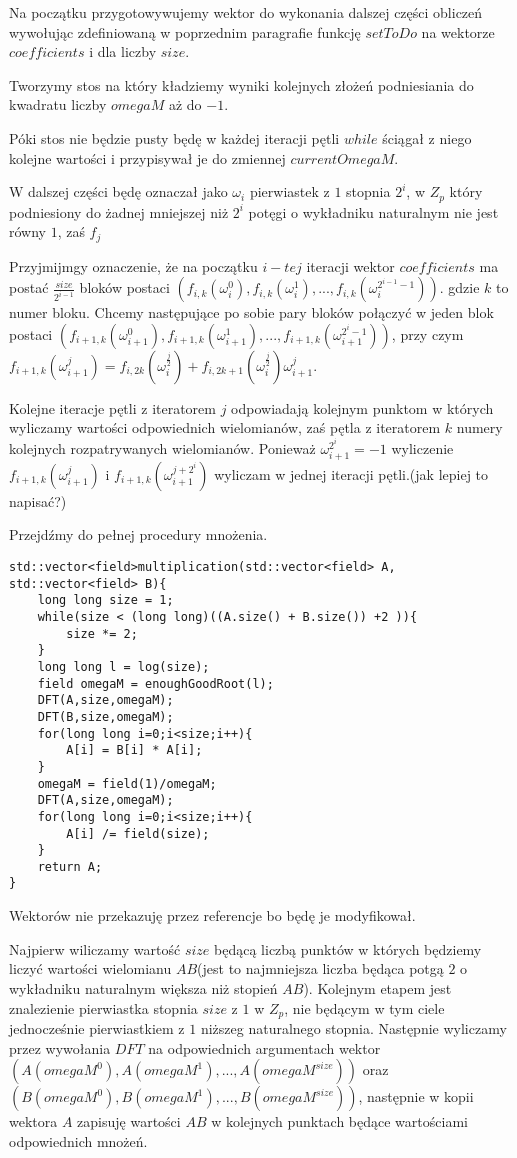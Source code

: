 \documentclass{article}
\begin{document}
Na początku przygotowywujemy wektor do wykonania dalszej części obliczeń wywołując zdefiniowaną w poprzednim paragrafie funkcję $setToDo$ na wektorze $coefficients$ i dla liczby $size$. 

Tworzymy stos na który kładziemy wyniki kolejnych złożeń podniesiania do kwadratu liczby $omegaM$ aż do $-1$.

Póki stos nie będzie pusty będę w każdej iteracji pętli $while$ ściągał z niego kolejne wartości i przypisywał je do zmiennej $currentOmegaM$.

W dalszej części będę oznaczał jako $\omega_i$ pierwiastek z $1$ stopnia $2^i$, w $Z_p$ który podniesiony do żadnej mniejszej niż $2^i$ potęgi o wykładniku
naturalnym nie jest równy $1$, zaś $f_{j}$

Przyjmijmgy oznaczenie, że na początku $i-tej$ iteracji wektor $coefficients$ ma postać $\frac{size}{2^{i-1}}$ bloków postaci
$(f_{i,k}(\omega_i^0),f_{i,k}(\omega_i^1),...,f_{i,k}(\omega^{2^{i-1}-1}_i))$. gdzie $k$ to numer bloku. Chcemy
następujące po sobie pary bloków połączyć w jeden blok postaci $(f_{i+1,k}(\omega_{i+1}^0),f_{i+1,k}(\omega_{i+1}^1),...,
f_{i+1,k}(\omega^{2^{i}-1}_{i+1}))$, przy czym 
$f_{i+1,k}(\omega_{i+1}^j) = f_{i,2k}(\omega_{i}^\frac{j}{2})+f_{i,2k+1}(\omega_{i}^{\frac{j}{2}})\omega_{i+1}^j$. 

Kolejne iteracje pętli z iteratorem $j$ odpowiadają kolejnym punktom w których wyliczamy wartości odpowiednich wielomianów, zaś pętla z iteratorem $k$
numery kolejnych rozpatrywanych wielomianów. Ponieważ $\omega_{i+1}^{2^i}=-1$ wyliczenie $f_{i+1,k}(\omega_{i+1}^{j})$ i $f_{i+1,k}(\omega_{i+1}^{j+2^i})$ 
wyliczam w jednej iteracji pętli.(jak lepiej to napisać?)


Przejdźmy do pełnej procedury mnożenia. 
\begin{lstlisting}
std::vector<field>multiplication(std::vector<field> A, std::vector<field> B){
    long long size = 1;
    while(size < (long long)((A.size() + B.size()) +2 )){
        size *= 2;
    }
    long long l = log(size);
    field omegaM = enoughGoodRoot(l);
    DFT(A,size,omegaM);  
    DFT(B,size,omegaM);
    for(long long i=0;i<size;i++){
        A[i] = B[i] * A[i]; 
    }
    omegaM = field(1)/omegaM;
    DFT(A,size,omegaM);
    for(long long i=0;i<size;i++){
        A[i] /= field(size);
    }
    return A;
}
\end{lstlisting}
Wektorów nie przekazuję przez referencje bo będę je modyfikował.

Najpierw wiliczamy wartość $size$ będącą liczbą punktów w których będziemy liczyć wartości wielomianu $AB$(jest to najmniejsza liczba będąca potgą 
$2$ o wykładniku naturalnym większa niż stopień $AB$). Kolejnym etapem jest znalezienie pierwiastka stopnia $size$ z $1$ w $Z_p$, nie będącym w tym ciele jednocześnie pierwiastkiem 
z $1$ niższeg naturalnego stopnia. Następnie wyliczamy przez wywołania $DFT$ na odpowiednich argumentach wektor $(A(omegaM^0),A(omegaM^1),...,A(omegaM^{size}))$ oraz
$(B(omegaM^0),B(omegaM^1),...,B(omegaM^{size}))$, następnie w kopii wektora $A$ zapisuję wartości $AB$ w kolejnych punktach będące wartościami odpowiednich 
mnożeń.
\end{document}
